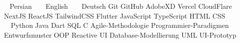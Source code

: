 

\begin{cvskills}

 {
   ~ Persian ~ 
   ~ English ~ 
   ~ Deutsch
}
 {
  Git \mitdiv GitHub \mitdiv AdobeXD \mitdiv {} Vercel \mitdiv CloudFlare
}
 {
  NextJS \mitdiv ReactJS \mitdiv TailwindCSS \mitdiv Flutter
}
 {
  JavaScript \mitdiv TypeScript \mitdiv HTML \mitdiv CSS 
}
\cvskill {} {
   \ \  Python \mitdiv Java \mitdiv Dart \mitdiv SQL \mitdiv C
}
 {
  Agile-Methodologie \mitdiv Programmier-Paradigmen \mitdiv Entwurfsmuster \mitdiv OOP
}
\cvskill {} {
  Reactive UI \mitdiv Database-Modellierung \mitdiv UML \mitdiv UI-Prototyp
}
\end{cvskills}
